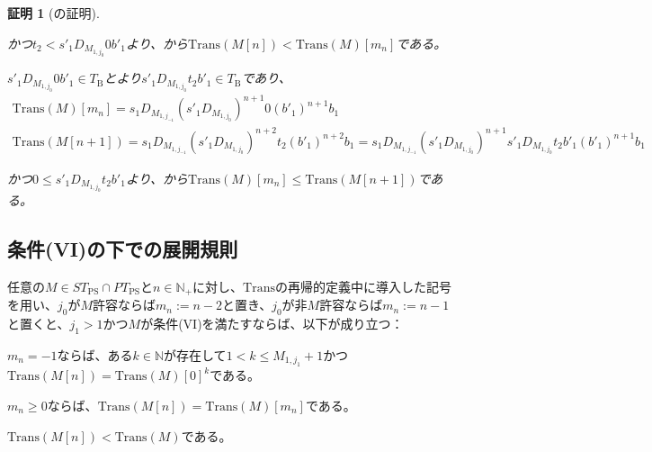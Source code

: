\documentclass[dvipdfmx,uplatex]{jsarticle}
\theoremstyle{customnonumberbreakfortheorem}
\theoremstyle{customnonumberbreakforproof}
\newtheorem{hideableproof}{証明}
\begin{document}
\begin{hideableproof}[の証明]
\begin{penumerate}
\begin{indented}
			\item かつ\(t_2 < s'_1 D_{M_{1,j_0}} 0 b'_1\)より、から\(\textrm{Trans}(M[n]) < \textrm{Trans}(M)[m_n]\)である。
			\item \(s'_1 D_{M_{1,j_0}} 0 b'_1 \in T_{\textrm{B}}\)とより\(s'_1 D_{M_{1,j_0}} t_2 b'_1 \in T_{\textrm{B}}\)であり、
			\begin{eqnarray*}
			\textrm{Trans}(M)[m_n] = s_1 D_{M_{1,j_{-1}}} (s'_1 D_{M_{1,j_0}})^{n+1} 0 (b'_1)^{n+1} b_1 \\
			\textrm{Trans}(M[n+1]) = s_1 D_{M_{1,j_{-1}}} (s'_1 D_{M_{1,j_0}})^{n+2} t_2 (b'_1)^{n+2} b_1 = s_1 D_{M_{1,j_{-1}}} (s'_1 D_{M_{1,j_0}})^{n+1} s'_1 D_{M_{1,j_0}} t_2 b'_1 (b'_1)^{n+1} b_1
			\end{eqnarray*}
			\item かつ\(0 \leq s'_1 D_{M_{1,j_0}} t_2 b'_1\)より、から\(\textrm{Trans}(M)[m_n] \leq \textrm{Trans}(M[n+1])\)である。
		\end{indented}
	\end{penumerate}
\end{hideableproof}


\subsection{条件(VI)の下での展開規則}

\begin{proposition}\label{条件(VI)の下でのTransと基本列の交換関係}
	任意の\(M \in ST_{\textrm{PS}} \cap PT_{\textrm{PS}}\)と\(n \in \mathbb{N}_{+}\)に対し、\(\textrm{Trans}\)の再帰的定義中に導入した記号を用い、\(j_0\)が\(M\)許容ならば\(m_n := n-2\)と置き、\(j_0\)が非\(M\)許容ならば\(m_n := n-1\)と置くと、\(j_1 > 1\)かつ\(M\)が条件(VI)を満たすならば\footnotemark{}、以下が成り立つ：
	\begin{penumerate}
		\item \(m_n = -1\)ならば、ある\(k \in \mathbb{N}\)が存在して\(1 < k \leq M_{1,j_1}+1\)かつ\(\textrm{Trans}(M[n]) = \textrm{Trans}(M)[0]^k\)である。
		\item \(m_n \geq 0\)ならば、\(\textrm{Trans}(M[n]) = \textrm{Trans}(M)[m_n]\)である。
		\item \(\textrm{Trans}(M[n]) < \textrm{Trans}(M)\)である。
	\end{penumerate}
\end{proposition}
\end{document}
